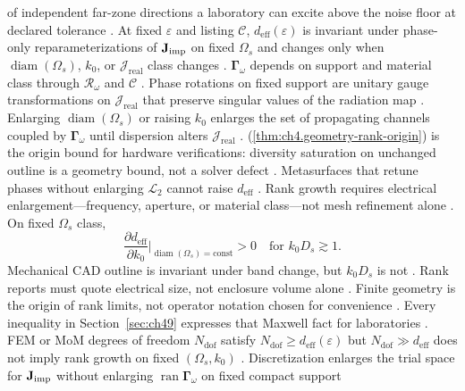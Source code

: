 of independent far-zone directions a laboratory can excite above the noise floor at declared tolerance \cite{harrington2001}.
\label{thm:ch4.geometry-rank-origin}
At fixed \(\varepsilon\) and listing \(\mathcal{C}\), \(d_{\mathrm{eff}}(\varepsilon)\) is invariant under phase-only
reparameterizations of \(\mathbf{J}_{\mathrm{imp}}\) on fixed \(\Omega_{s}\) and changes only when \(\operatorname{diam}(\Omega_{s})\), \(k_{0}\), or
\(\mathcal{J}_{\mathrm{real}}\) class changes \cite{stratton1941}.
\(\boldsymbol{\Gamma}_\omega\) depends on support and material class through \(\mathcal{R}_\omega\) and \(\mathcal{C}\) \cite{stratton1941}.
Phase rotations on fixed support are unitary gauge transformations on \(\mathcal{J}_{\mathrm{real}}\) that preserve singular values of the radiation map
\cite{hansen1988}. Enlarging \(\operatorname{diam}(\Omega_{s})\) or raising \(k_{0}\) enlarges the set of propagating channels coupled by
\(\boldsymbol{\Gamma}_\omega\) until dispersion alters \(\mathcal{J}_{\mathrm{real}}\) \cite{jackson1999}.
(\ref{thm:ch4.geometry-rank-origin}) is the origin bound for hardware verifications: diversity saturation on unchanged outline is a geometry bound,
not a solver defect \cite{stratton1941}. Metasurfaces that retune phases without enlarging \(\mathcal{L}_{2}\) cannot raise \(d_{\mathrm{eff}}\)
\cite{hansen1988}. Rank growth requires electrical enlargement---frequency, aperture, or material class---not mesh refinement alone
\cite{jackson1999}.
On fixed \(\Omega_{s}\) class,
\begin{equation}
\label{eq:ch4.outline-trap}
\frac{\partial d_{\mathrm{eff}}}{\partial k_{0}}\Big|_{\operatorname{diam}(\Omega_{s})=\text{const}}>0\quad\text{for }k_{0}D_{s}\gtrsim1.
\end{equation}
Mechanical CAD outline is invariant under band change, but \(k_{0}D_{s}\) is not \cite{jackson1999}. Rank reports must quote electrical
size, not enclosure volume alone \cite{hansen1988}.
Finite geometry is the origin of rank limits, not operator notation chosen for convenience \cite{maxwell1873}. Every inequality in Section~\ref{sec:ch49} expresses that Maxwell fact for laboratories \cite{devaney2004}.
\label{lem:ch4.mesh-dof-trap}
FEM or MoM degrees of freedom \(N_{\mathrm{dof}}\) satisfy \(N_{\mathrm{dof}}\ge d_{\mathrm{eff}}(\varepsilon)\) but \(N_{\mathrm{dof}}\gg d_{\mathrm{eff}}\)
does not imply rank growth on fixed \((\Omega_{s},k_{0})\) \cite{harrington2001}.
Discretization enlarges the trial space for \(\mathbf{J}_{\mathrm{imp}}\) without enlarging \(\operatorname{ran}\boldsymbol{\Gamma}_\omega\) on fixed compact support
